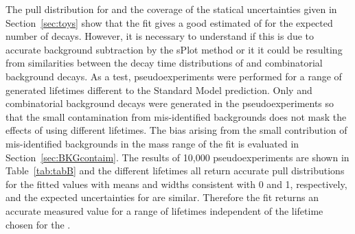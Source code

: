 The pull distribution for \Gmumu and the coverage of the statical uncertainties given in Section~\ref{sec:toys} show that the fit gives a good estimated of \tmumu for the expected number of decays. However, it is necessary to understand if this is due to accurate background subtraction by the sPlot method or it it could be resulting from similarities between the decay time distributions of \bsmumu and combinatorial background decays. As a test, pseudoexperiments were performed for a range of generated \bsmumu lifetimes different to the Standard Model prediction. Only \bsmumu and combinatorial background decays were generated in the pseudoexperiments so that the small contamination from mis-identified backgrounds does not mask the effects of using different lifetimes. The bias arising from the small contribution of mis-identified backgrounds in the mass range of the fit is evaluated in Section~\ref{sec:BKGcontaim}. The results of 10,000 pseudoexperiments are shown in Table~\ref{tab:tabB} and the different lifetimes all return accurate pull distributions for the fitted \Gmumu values with means and widths consistent with 0 and 1, respectively, and the expected uncertainties for \tmumu are similar. Therefore the fit returns an accurate measured value for a range of \bsmumu lifetimes independent of the lifetime chosen for the \bs.
